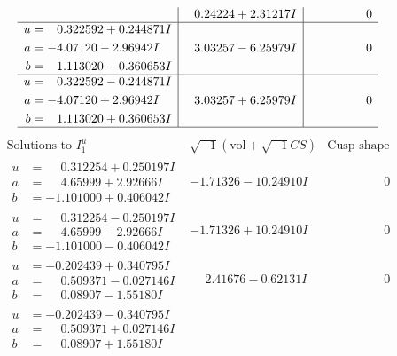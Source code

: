 \documentclass[1p]{elsarticle_modified}
\theoremstyle{definition}
\newcommand{\I}{\sqrt{-1}}
\begin{document}
$$\begin{array}{c|c|c}
 & \phantom{-}0.24224 + 2.31217 I & \phantom{-0.000000 } 0 \\ \hline\begin{aligned}
u &= \phantom{-}0.322592 + 0.244871 I \\
a &= -4.07120 - 2.96942 I \\
b &= \phantom{-}1.113020 - 0.360653 I\end{aligned}
 & \phantom{-}3.03257 - 6.25979 I & \phantom{-0.000000 } 0 \\ \hline\begin{aligned}
u &= \phantom{-}0.322592 - 0.244871 I \\
a &= -4.07120 + 2.96942 I \\
b &= \phantom{-}1.113020 + 0.360653 I\end{aligned}
 & \phantom{-}3.03257 + 6.25979 I & \phantom{-0.000000 } 0\\
 \hline 
 \end{array}$$\newpage$$\begin{array}{c|c|c}  
\text{Solutions to }I^u_{1}& \I (\text{vol} + \sqrt{-1}CS) & \text{Cusp shape}\\
 \hline 
\begin{aligned}
u &= \phantom{-}0.312254 + 0.250197 I \\
a &= \phantom{-}4.65999 + 2.92666 I \\
b &= -1.101000 + 0.406042 I\end{aligned}
 & -1.71326 - 10.24910 I & \phantom{-0.000000 } 0 \\ \hline\begin{aligned}
u &= \phantom{-}0.312254 - 0.250197 I \\
a &= \phantom{-}4.65999 - 2.92666 I \\
b &= -1.101000 - 0.406042 I\end{aligned}
 & -1.71326 + 10.24910 I & \phantom{-0.000000 } 0 \\ \hline\begin{aligned}
u &= -0.202439 + 0.340795 I \\
a &= \phantom{-}0.509371 - 0.027146 I \\
b &= \phantom{-}0.08907 - 1.55180 I\end{aligned}
 & \phantom{-}2.41676 - 0.62131 I & \phantom{-0.000000 } 0 \\ \hline\begin{aligned}
u &= -0.202439 - 0.340795 I \\
a &= \phantom{-}0.509371 + 0.027146 I \\
b &= \phantom{-}0.08907 + 1.55180 I\end{aligned}

\end{array}$$
\end{document}
